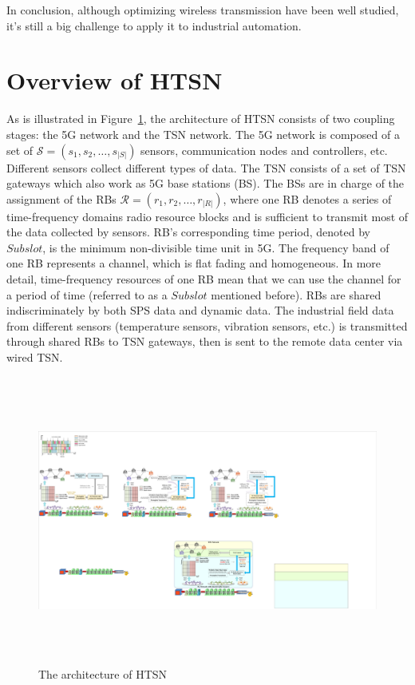 \documentclass{SCIS2021}
\begin{document}
	\par In conclusion, although optimizing wireless transmission have been well studied, it's still a big challenge to apply it to industrial automation.


	\section{Overview of HTSN}
	\label{sec:Overview of HTSN}
	As is illustrated in Figure~\ref{fig:The architecture of HTSN}, the architecture of HTSN consists of two coupling stages: the 5G network and the TSN network. The 5G network is composed of a set of $\mathcal{S}=\left(s_{1}, s_{2}, \ldots, s_{|S|}\right)$ sensors, communication nodes and controllers, etc. Different sensors collect different types of data. The TSN consists of a set of TSN gateways which also work as 5G base stations (BS). The BSs are in charge of the assignment of the RBs $\mathcal{R}=\left(r_{1}, r_{2}, \ldots, r_{|R|}\right)$, {\color{blue} where one RB denotes a series of time-frequency domains radio resource blocks and is sufficient to transmit most of the data collected by sensors. RB's corresponding time period, denoted by $\mathit{Subslot}$, is the minimum non-divisible time unit in 5G. The frequency band of one RB represents a channel, which is flat fading and homogeneous. In more detail, time-frequency resources of one RB mean that we can use the channel for a period of time (referred to as a $Subslot$ mentioned before).} {\color{black}RBs are shared indiscriminately by both SPS data and dynamic data.} The industrial field data from different sensors (temperature sensors, vibration sensors, etc.) is transmitted through shared RBs to TSN gateways, then is sent to the remote data center via wired TSN.

	\begin{figure}[htb]
		\centering
		\includegraphics[height=9.5cm, width=13.8cm]{framework}
		\caption{The architecture of HTSN}
		\label{fig:The architecture of HTSN}
	\end{figure}
\end{document}

